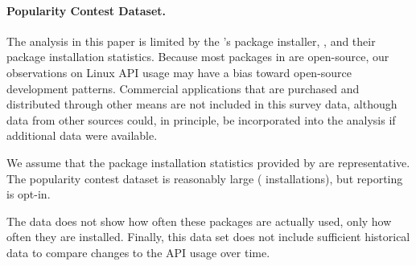 \paragraph{Popularity Contest Dataset.}
The analysis in this paper is limited
by the \osdist{}'s package installer, \osinstaller{},
and their package installation statistics.
Because most packages in \osdist{} are open-source,
our observations on Linux API usage may have a bias toward open-source development patterns.
Commercial applications that are purchased and distributed
through other means are not included in this survey data,
although data from other sources could, in principle, be incorporated
into the analysis if additional data were available.

We assume that the package installation statistics provided by \osdist{} are representative.
The popularity contest dataset is reasonably large (\popsamples{} installations),
but reporting is opt-in.

The data does not show how often these packages
are actually used, only how often they are installed.
Finally, this data set does not include sufficient historical data
to compare changes to the API usage over time.







